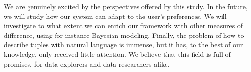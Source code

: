 We are genuinely excited by the perspectives offered by this study. In the
future, we will study how our system can adapt to the user's preferences. We
will investigate to what extent we can enrich our framework with other measures
of difference, using for instance Bayesian modeling. Finally, the problem of
how to describe tuples with natural language is immense, but it has, to the
best of our knowledge, only received little attention. We believe that this
field is full of promises, for data explorers and data researchers alike.


%
%


